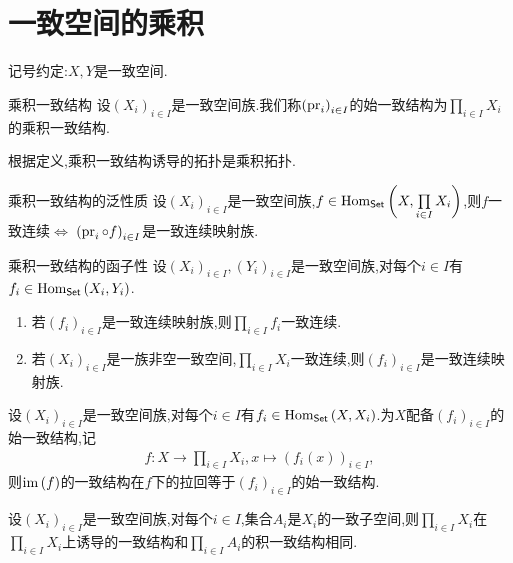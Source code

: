 \section{一致空间的乘积}

记号约定:$X,Y$是一致空间.

\begin{definition}{乘积一致结构}{}
	设$\left(X_{i}\right)_{i\in I}$是一致空间族.我们称$\left(\operatorname{pr}_{i}\right)_{i\in I}$的始一致结构为$\prod\limits_{i\in I}X_{i}$的乘积一致结构.
\end{definition}

\begin{remark}{}{}
	根据定义,乘积一致结构诱导的拓扑是乘积拓扑.
\end{remark}

\begin{proposition}{乘积一致结构的泛性质}{}
	设$\left(X_{i}\right)_{i\in I}$是一致空间族,$f\in\operatorname{Hom}_{\mathsf{Set}}\left(X,\prod\limits_{i\in I}X_{i}\right)$,则$f$一致连续$\iff$ $\left(\operatorname{pr}_{i}\circ f\right)_{i\in I}$是一致连续映射族.
\end{proposition}

\begin{corollary}{乘积一致结构的函子性}{}
	设$\left(X_{i}\right)_{i\in I},\left(Y_{i}\right)_{i\in I}$是一致空间族,对每个$i\in I$有$f_{i}\in\operatorname{Hom}_{\mathsf{Set}}\left(X_{i},Y_{i}\right)$.
	\begin{enumerate}
		\item 若$\left(f_{i}\right)_{i\in I}$是一致连续映射族,则$\prod\limits_{i\in I}f_{i}$一致连续.
		\item 若$\left(X_{i}\right)_{i\in I}$是一族非空一致空间,$\prod\limits_{i\in I}X_{i}$一致连续,则$\left(f_{i}\right)_{i\in I}$是一致连续映射族.
	\end{enumerate}
\end{corollary}

\begin{proposition}{}{}
	设$\left(X_{i}\right)_{i\in I}$是一致空间族,对每个$i\in I$有$f_{i}\in\operatorname{Hom}_{\mathsf{Set}}\left(X,X_{i}\right)$.为$X$配备$\left(f_{i}\right)_{i\in I}$的始一致结构,记
	\begin{align*}
		f:X\to\prod\limits_{i\in I}X_{i},x\mapsto\left(f_{i}\left(x\right)\right)_{i\in I},
	\end{align*}
	则$\operatorname{im}\left(f\right)$的一致结构在$f$下的拉回等于$\left(f_{i}\right)_{i\in I}$的始一致结构.
\end{proposition}

\begin{corollary}{}{}
	设$\left(X_{i}\right)_{i\in I}$是一致空间族,对每个$i\in I$,集合$A_{i}$是$X_{i}$的一致子空间,则$\prod\limits_{i\in I}X_{i}$在$\prod\limits_{i\in I}X_{i}$上诱导的一致结构和$\prod\limits_{i\in I}A_{i}$的积一致结构相同.
\end{corollary}

